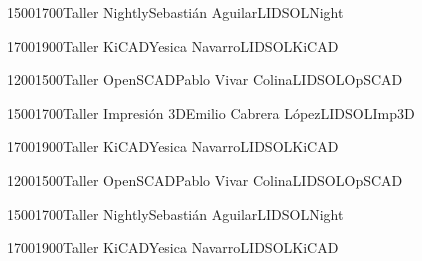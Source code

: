 \documentclass[a4paper,10pt]{report}
\begin{document}
\begin{landscape}
\begin{timetable}
     
        {1500}{1700}{Taller Nightly}{Sebasti\'{a}n Aguilar}{{\tiny LIDSOL}}{Night}
   
     {1700}{1900}{Taller KiCAD}{Yesica Navarro}{{\tiny LIDSOL}}{KiCAD}
   
   
   
   
  {1200}{1500}{Taller OpenSCAD}{Pablo Vivar Colina}{{\tiny LIDSOL}}{OpSCAD}
 
   {1500}{1700}{Taller Impresión 3D}{Emilio Cabrera L\'{o}pez}{{\tiny LIDSOL}}{Imp3D}
  
   {1700}{1900}{Taller KiCAD}{Yesica Navarro}{{\tiny LIDSOL}}{KiCAD}
   
   
   
   
   
   
    {1200}{1500}{Taller OpenSCAD}{Pablo Vivar Colina}{{\tiny LIDSOL}}{OpSCAD}
   
    
     {1500}{1700}{Taller Nightly}{Sebasti\'{a}n Aguilar}{{\tiny LIDSOL}}{Night}
    
     {1700}{1900}{Taller KiCAD}{Yesica Navarro}{{\tiny LIDSOL}}{KiCAD}
   
   
   
   
   


 
 
   
     
   
   
   
  
   
  
  
    
   
 \end{timetable}
 \end{landscape}
 
\end{document}
